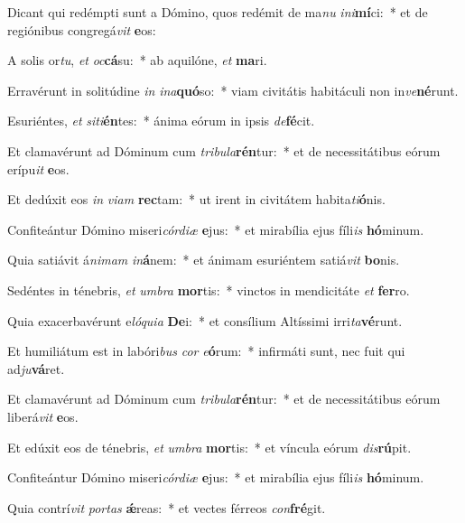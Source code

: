 \item Dicant qui redémpti sunt a Dómino, quos redémit de ma\textit{nu} \textit{in}\textit{i}\textbf{mí}ci:~* et de regiónibus congregá\textit{vit} \textbf{e}os:
\item A solis or\textit{tu}, \textit{et} \textit{oc}\textbf{cá}su:~* ab aquilóne, \textit{et} \textbf{ma}ri.
\item Erravérunt in solitúdine \textit{in} \textit{in}\textit{a}\textbf{quó}so:~* viam civitátis habitáculi non in\textit{ve}\textbf{né}runt.
\item Esuriéntes, \textit{et} \textit{si}\textit{ti}\textbf{én}tes:~* ánima eórum in ipsis \textit{de}\textbf{fé}cit.
\item Et clamavérunt ad Dóminum cum \textit{tri}\textit{bu}\textit{la}\textbf{rén}tur:~* et de necessitátibus eórum erípu\textit{it} \textbf{e}os.
\item Et dedúxit eos \textit{in} \textit{vi}\textit{am} \textbf{rec}tam:~* ut irent in civitátem habita\textit{ti}\textbf{ó}nis.
\item Confiteántur Dómino miseri\textit{cór}\textit{di}\textit{æ} \textbf{e}jus:~* et mirabília ejus fíli\textit{is} \textbf{hó}minum.
\item Quia satiávit á\textit{ni}\textit{mam} \textit{in}\textbf{á}nem:~* et ánimam esuriéntem satiá\textit{vit} \textbf{bo}nis.
\item Sedéntes in ténebris, \textit{et} \textit{um}\textit{bra} \textbf{mor}tis:~* vinctos in mendicitáte \textit{et} \textbf{fer}ro.
\item Quia exacerbavérunt e\textit{ló}\textit{qui}\textit{a} \textbf{De}i:~* et consílium Altíssimi irri\textit{ta}\textbf{vé}runt.
\item Et humiliátum est in labóri\textit{bus} \textit{cor} \textit{e}\textbf{ó}rum:~* infirmáti sunt, nec fuit qui ad\textit{ju}\textbf{vá}ret.
\item Et clamavérunt ad Dóminum cum \textit{tri}\textit{bu}\textit{la}\textbf{rén}tur:~* et de necessitátibus eórum liberá\textit{vit} \textbf{e}os.
\item Et edúxit eos de ténebris, \textit{et} \textit{um}\textit{bra} \textbf{mor}tis:~* et víncula eórum \textit{dis}\textbf{rú}pit.
\item Confiteántur Dómino miseri\textit{cór}\textit{di}\textit{æ} \textbf{e}jus:~* et mirabília ejus fíli\textit{is} \textbf{hó}minum.
\item Quia contrí\textit{vit} \textit{por}\textit{tas} \textbf{ǽ}reas:~* et vectes férreos \textit{con}\textbf{fré}git.
